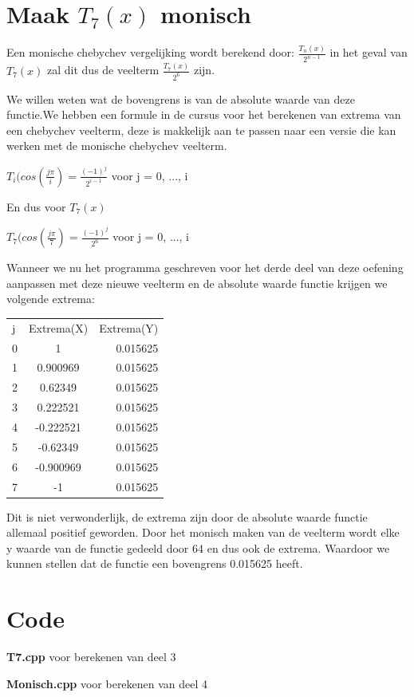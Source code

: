 \documentclass{article}
\begin{document}
\begin{flushleft}
\section{Maak $T_{7}(x)$ monisch}
Een monische chebychev vergelijking wordt berekend door: $\frac{T_{n}(x)}{2^{n-1}}$ in het geval van $T_{7}(x)$ zal dit dus de veelterm $\frac{T_{7}(x)}{2^{6}}$ zijn.
\newline

We willen weten wat de bovengrens is van de absolute waarde van deze functie.We hebben een formule in de cursus voor het berekenen van extrema van een chebychev veelterm, deze is makkelijk aan te passen naar een versie die kan werken met de monische chebychev veelterm.
\newline

$  T_{i}(cos(\frac{j\pi}{i}) = \frac{ (-1)^{j} }{2^{i-1}} $ voor j = 0, ..., i
\newline

En dus voor $T_{7}(x)$
\newline

$  T_{7}(cos(\frac{j\pi}{7})  = \frac{ (-1)^{j} }{2^{6}} $ voor j = 0, ..., i
\newline

Wanneer we nu het programma geschreven voor het derde deel van deze oefening aanpassen met deze nieuwe veelterm en de absolute waarde functie krijgen we volgende extrema:
\newline

\begin{tabular}{ l c r }
  j & Extrema(X) & Extrema(Y) \\
  0 &  1 & 0.015625  \\
  1 & 0.900969 &  0.015625  \\
  2 &  0.62349 & 0.015625  \\
  3 & 0.222521 & 0.015625  \\
  4 & -0.222521 &  0.015625  \\
  5 & -0.62349 &  0.015625  \\
  6 & -0.900969 & 0.015625   \\
  7 &  -1 &  0.015625  \\  
\end{tabular}
\newline
\newline

Dit is niet verwonderlijk, de extrema zijn door de absolute waarde functie allemaal positief geworden. Door het monisch maken van de veelterm wordt elke y waarde van de functie gedeeld door 64 en dus ook de extrema. Waardoor we kunnen stellen dat de functie een bovengrens 0.015625 heeft.

\section{Code}
\textbf{T7.cpp} voor berekenen van deel 3



\textbf{Monisch.cpp} voor berekenen van deel 4



\end{flushleft}
\end{document}

